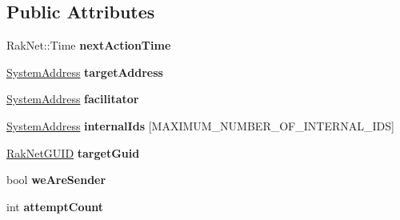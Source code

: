 \subsection*{Public Attributes}
\begin{DoxyCompactItemize}
\item 
\hypertarget{struct_rak_net_1_1_nat_punchthrough_client_1_1_send_ping_a072bb2dc67069c28c4eab0934bf2ea90}{Rak\-Net\-::\-Time {\bfseries next\-Action\-Time}}\label{struct_rak_net_1_1_nat_punchthrough_client_1_1_send_ping_a072bb2dc67069c28c4eab0934bf2ea90}

\item 
\hypertarget{struct_rak_net_1_1_nat_punchthrough_client_1_1_send_ping_a9a8c6781ca124f4c25bed069a1d61dab}{\hyperlink{struct_rak_net_1_1_system_address}{System\-Address} {\bfseries target\-Address}}\label{struct_rak_net_1_1_nat_punchthrough_client_1_1_send_ping_a9a8c6781ca124f4c25bed069a1d61dab}

\item 
\hypertarget{struct_rak_net_1_1_nat_punchthrough_client_1_1_send_ping_a5e33f5d804a3c997d34a8555e0e0a5a6}{\hyperlink{struct_rak_net_1_1_system_address}{System\-Address} {\bfseries facilitator}}\label{struct_rak_net_1_1_nat_punchthrough_client_1_1_send_ping_a5e33f5d804a3c997d34a8555e0e0a5a6}

\item 
\hypertarget{struct_rak_net_1_1_nat_punchthrough_client_1_1_send_ping_a6f3c9a72c88f0420462bb77994a97744}{\hyperlink{struct_rak_net_1_1_system_address}{System\-Address} {\bfseries internal\-Ids} \mbox{[}M\-A\-X\-I\-M\-U\-M\-\_\-\-N\-U\-M\-B\-E\-R\-\_\-\-O\-F\-\_\-\-I\-N\-T\-E\-R\-N\-A\-L\-\_\-\-I\-D\-S\mbox{]}}\label{struct_rak_net_1_1_nat_punchthrough_client_1_1_send_ping_a6f3c9a72c88f0420462bb77994a97744}

\item 
\hypertarget{struct_rak_net_1_1_nat_punchthrough_client_1_1_send_ping_a69e393edaf743eee3b3a9c3e46dfcada}{\hyperlink{struct_rak_net_1_1_rak_net_g_u_i_d}{Rak\-Net\-G\-U\-I\-D} {\bfseries target\-Guid}}\label{struct_rak_net_1_1_nat_punchthrough_client_1_1_send_ping_a69e393edaf743eee3b3a9c3e46dfcada}

\item 
\hypertarget{struct_rak_net_1_1_nat_punchthrough_client_1_1_send_ping_a9a472826641a3e7b592ab9665a90576a}{bool {\bfseries we\-Are\-Sender}}\label{struct_rak_net_1_1_nat_punchthrough_client_1_1_send_ping_a9a472826641a3e7b592ab9665a90576a}

\item 
\hypertarget{struct_rak_net_1_1_nat_punchthrough_client_1_1_send_ping_a4be3e002925b371173ac54859c73fa81}{int {\bfseries attempt\-Count}}\label{struct_rak_net_1_1_nat_punchthrough_client_1_1_send_ping_a4be3e002925b371173ac54859c73fa81}


\end{DoxyCompactItemize}
